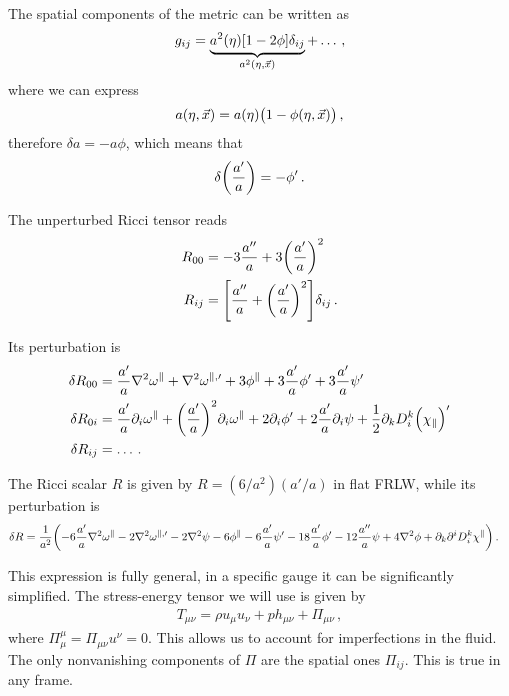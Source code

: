 \documentclass[main.tex]{subfiles}
\begin{document}
The spatial components of the metric can be written as 
%
\begin{align}
g_{ij} = \underbrace{a^2(\eta ) \qty[1 - 2 \phi ] \delta_{ij}}_{a^2(\eta , \vec{x})} + \dots
\,,
\end{align}
%
where we can express 
%
\begin{align}
a(\eta , \vec{x}) = a(\eta ) \qty(1 - \phi (\eta , \vec{x}))
\,,
\end{align}
%
therefore \(\delta a = - a \phi \), which means that 
%
\begin{align}
\delta \qty( \frac{a^{\prime}}{a}) = - \phi '
\,.
\end{align}

The unperturbed Ricci tensor reads 
%
\begin{align}
R_{00} &= - 3 \frac{a''}{a} + 3 \qty( \frac{a'}{a})^2  \\
R_{ij} &=  \qty[\frac{a''}{a} + \qty(\frac{a'}{a})^2] \delta_{ij} 
\,.
\end{align}

Its perturbation is 
%
\begin{align}
\delta R_{00} &= \frac{a'}{a} \nabla^2 \omega^{\parallel} + \nabla^2 \omega^{\parallel, \prime} + 3 \phi^{\parallel} + 3 \frac{a'}{a} \phi' + 3 \frac{a'}{a} \psi '  \\
\delta R_{0i} &= \frac{a'}{a} \partial_{i} \omega^{\parallel} + \qty(\frac{a'}{a})^2 \partial_{i} \omega^{\parallel} +2 \partial_{i} \phi' + 2 \frac{a'}{a} \partial_{i} \psi + \frac{1}{2} \partial_{k} D^{k}_i \qty(\chi_{\parallel})'  \\
\delta R_{ij} &= \dots
\,.
\end{align}


The Ricci scalar \(R\) is given by \(R = (6/a^2) (a' / a)\) in flat FRLW, while its perturbation is 
%
\begin{align}
\delta R &= \frac{1}{a^2} \qty(- 6 \frac{a'}{a} \nabla^2\omega^{\parallel} - 2 \nabla^2 \omega^{\parallel, \prime} - 2 \nabla^2 \psi - 6 \phi^{\parallel} - 6 \frac{a'}{a} \psi' - 18 \frac{a'}{a} \phi ' - 12 \frac{a''}{a} \psi + 4 \nabla^2 \phi + \partial_{k} \partial^{i} D^{k}_{i} \chi^{\parallel})
\,.
\end{align}

This expression is fully general, in a specific gauge it can be significantly simplified.  
The stress-energy tensor we will use is given by 
%
\begin{align}
T_{\mu \nu } = \rho u_\mu u_\nu + p h_{\mu \nu } + \Pi_{\mu \nu }
\,,
\end{align}
%
where \(\Pi^{\mu }_{\mu } = \Pi_{\mu \nu } u^{\nu } = 0\). This allows us to account for imperfections in the fluid. The only nonvanishing components of \(\Pi \) are the spatial ones \(\Pi_{ij}\). 
This is true in any frame. 
\end{document}
